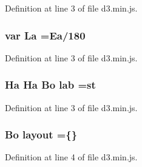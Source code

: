 Definition at line 3 of file d3.\+min.\+js.

\subsubsection[{La}]{\setlength{\rightskip}{0pt plus 5cm}var La ={\bf Ea}/180}\label{d3_8min_8js_ae729da86b7836f94c1cce886096366ee}


Definition at line 3 of file d3.\+min.\+js.

\subsubsection[{lab}]{ {\bf Ha} {\bf Ha} {\bf Bo} lab =st}\label{d3_8min_8js_ac8b445a42364c52b8b7c98052ebad626}


Definition at line 3 of file d3.\+min.\+js.

\subsubsection[{layout}]{ {\bf Bo} layout =\{\}}\label{d3_8min_8js_a7dc559f8c838c381f4552aa9099411f9}


Definition at line 4 of file d3.\+min.\+js.

